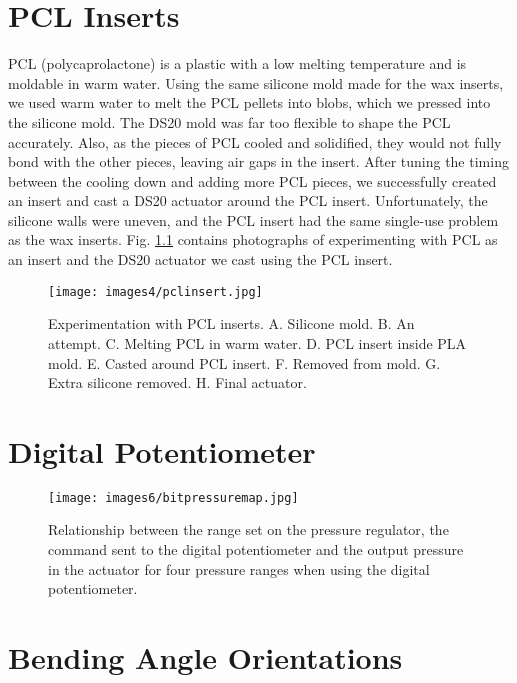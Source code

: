 \appendix

\chapter{PCL Inserts}
\label{appendix:pcl}

PCL (polycaprolactone) is a plastic with a low melting temperature and is moldable in warm water. Using the same silicone mold made for the wax inserts, we used warm water to melt the PCL pellets into blobs, which we pressed into the silicone mold. The DS20 mold was far too flexible to shape the PCL accurately. Also, as the pieces of PCL cooled and solidified, they would not fully bond with the other pieces, leaving air gaps in the insert. After tuning the timing between the cooling down and adding more PCL pieces, we successfully created an insert and cast a DS20 actuator around the PCL insert. Unfortunately, the silicone walls were uneven, and the PCL insert had the same single-use problem as the wax inserts. Fig. \ref{fig:pclinsert} contains photographs of experimenting with PCL as an insert and the DS20 actuator we cast using the PCL insert.

\begin{figure}[!ht]
    \centering
    \texttt{[image: images4/pclinsert.jpg]}
    \caption{Experimentation with PCL inserts. A. Silicone mold. B. An attempt. C. Melting PCL in warm water. D. PCL insert inside PLA mold. E. Casted around PCL insert. F. Removed from mold. G. Extra silicone removed. H. Final actuator.}
    \label{fig:pclinsert}
\end{figure}

\chapter{Digital Potentiometer}
\label{appendix:bitmap}

\begin{figure}[!ht]
    \centering
    \texttt{[image: images6/bitpressuremap.jpg]}
    \caption{Relationship between the range set on the pressure regulator, the command sent to the digital potentiometer and the output pressure in the actuator for four pressure ranges when using the digital potentiometer.}
\end{figure}

\chapter{Bending Angle Orientations}
\label{appendix:ao}


